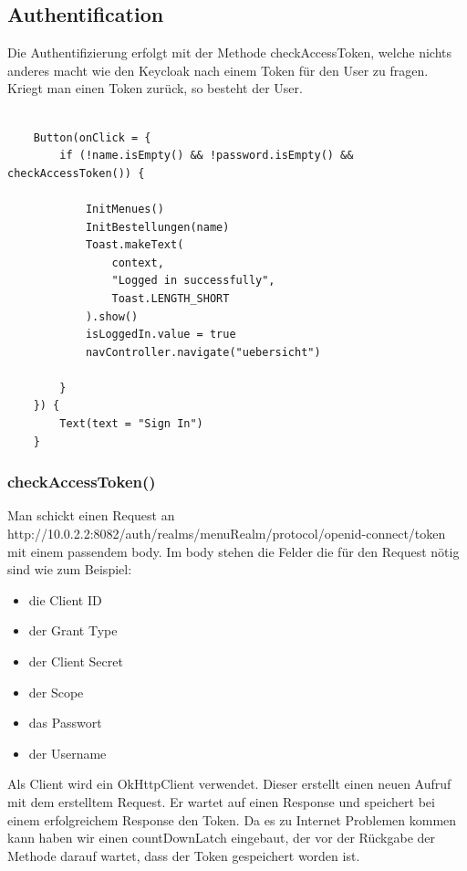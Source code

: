 \subsection{Authentification}
Die Authentifizierung erfolgt mit der Methode checkAccessToken, welche nichts anderes macht wie den Keycloak nach einem Token für den User zu fragen.
Kriegt man einen Token zurück, so besteht der User.

\begin{lstlisting}

    Button(onClick = {
        if (!name.isEmpty() && !password.isEmpty() && checkAccessToken()) {

            InitMenues()
            InitBestellungen(name)
            Toast.makeText(
                context,
                "Logged in successfully",
                Toast.LENGTH_SHORT
            ).show()
            isLoggedIn.value = true
            navController.navigate("uebersicht")

        }
    }) {
        Text(text = "Sign In")
    }

\end{lstlisting}

\subsubsection{checkAccessToken()}

Man schickt einen Request an http://10.0.2.2:8082/auth/realms/menuRealm/protocol/openid-connect/token mit einem passendem body.
Im body stehen die Felder die für den Request nötig sind wie zum Beispiel:
\begin{itemize}
    \item die Client ID
    \item der Grant Type 
    \item der Client Secret
    \item der Scope
    \item das Passwort
    \item der Username
\end{itemize}

Als Client wird ein OkHttpClient verwendet. Dieser erstellt einen neuen Aufruf mit dem erstelltem Request. 
Er wartet auf einen Response und speichert bei einem erfolgreichem Response den Token. Da es zu Internet Problemen kommen kann haben wir
einen countDownLatch eingebaut, der vor der Rückgabe der Methode darauf wartet, dass der Token gespeichert worden ist.  

